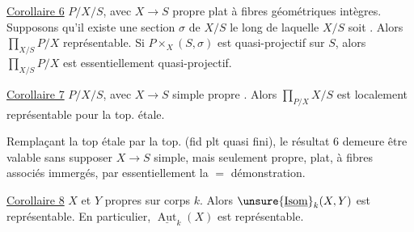 \uline{Corollaire 6} $P/X/S$, avec $X\to S$ propre plat à fibres géométriques intègres. Supposons qu'il existe une section $\sigma$ de $X/S$ le long de laquelle $X/S$ soit   . Alors $\prod_{X/S}P/X$ représentable. Si $P\mathbin{\times}_X(S,\sigma)$ est quasi-projectif sur $S$, alors $\prod_{X/S}P/X$ est essentiellement quasi-projectif.

\uline{Corollaire 7} $P/X/S$, avec $X\to S$ simple propre  . Alors $\prod_{P/X}X/S$ est localement représentable pour la top. étale.

Remplaçant la top étale par la top.  (fid plt quasi fini), le résultat 6 demeure être valable sans supposer $X\to S$ simple, mais seulement propre, plat, à fibres   associés immergés, par essentiellement la $=$ démonstration.

\uline{Corollaire 8} $X$ et $Y$ propres sur corps $k$. Alors $\unsure{\underline{\operatorname{Isom}}}_k(X,Y)$ est représentable. En particulier, $\underline{\operatorname{Aut}}_k(X)$ est représentable.
